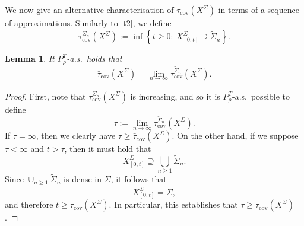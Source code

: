 \documentclass[a4paper, 11pt]{article}
\newtheorem{lem}[theorem]{Lemma}
\begin{document}
We now give an alternative characterisation of $\bar\tau_{\mathrm{cov}}({X}^\Sigma)$ in terms of a sequence of approximations. Similarly to \eqref{t2}, we define
\[\tau_{\mathrm{cov}}^{\tilde{\Sigma}_n}(X^\Sigma):=\inf\left\{t\geq 0:\:X^\Sigma_{[0,t]}\supseteq \tilde{\Sigma}_n\right\}.\]

\begin{lem}\label{lem45} It $P_\rho^T$-a.s.\ holds that
\[\bar\tau_{\mathrm{cov}}({X}^\Sigma)=\lim_{n\rightarrow\infty}\tau_{\mathrm{cov}}^{\tilde{\Sigma}_n}(X^\Sigma).\]
\end{lem}
\begin{proof}
First, note that $\tau_{\mathrm{cov}}^{\tilde{\Sigma}_n}(X^\Sigma)$ is increasing, and so it is $P_\rho^T$-a.s.\ possible to define
\[\tau:=\lim_{n\rightarrow\infty}\tau_{\mathrm{cov}}^{\tilde{\Sigma}_n}(X^\Sigma).\]
If $\tau=\infty$, then we clearly have $\tau\geq \bar\tau_{\mathrm{cov}}({X}^\Sigma)$. On the other hand, if we suppose $\tau<\infty$ and $t>\tau$, then it must hold that
\[X^{\Sigma}_{[0,t]}\supseteq\bigcup_{n\geq 1}\tilde\Sigma_n.\]
Since $\cup_{n\geq 1}\tilde\Sigma_n$ is dense in $\Sigma$, it follows that
\[\overline{X^\Sigma_{[0,t]}}=\Sigma,\]
and therefore $t\geq \bar\tau_{\mathrm{cov}}({X}^\Sigma)$. In particular, this establishes that $\tau\geq \bar\tau_{\mathrm{cov}}({X}^\Sigma)$.


\end{proof}
\end{document}
